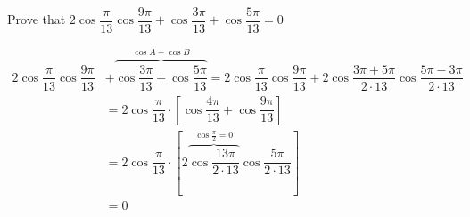 
%
%
%
%
% 
% 

\question[4] Prove that $2\cos\dfrac{\pi}{13}\cos\dfrac{9\pi}{13} + \cos\dfrac{3\pi}{13} + \cos\dfrac{5\pi}{13} = 0$


\ifprintanswers
\fi 

\begin{solution}[\halfpage]
   \begin{fullwidth}
     \begin{align}
        2\cos\dfrac{\pi}{13}\cos\dfrac{9\pi}{13} &+ \overbrace{\cos\dfrac{3\pi}{13} + \cos\dfrac{5\pi}{13}}^{\cos A + \cos B}
        = 2\cos\dfrac{\pi}{13}\cos\dfrac{9\pi}{13} + 
        2\cos\dfrac{3\pi + 5\pi}{2\cdot 13}\cos\dfrac{5\pi-3\pi}{2\cdot 13} \\
        &= 2\cos\dfrac{\pi}{13}\cdot\left[ \cos\dfrac{4\pi}{13} + \cos\dfrac{9\pi}{13} \right] \\
        &= 2\cos\dfrac{\pi}{13}\cdot\left[ 2\overbrace{\cos\dfrac{13\pi}{2\cdot 13}}^{\cos\frac{\pi}{2} = 0}\cos\dfrac{5\pi}{2\cdot 13}\right] \\
        &= 0
     \end{align}
   \end{fullwidth}
\end{solution}
